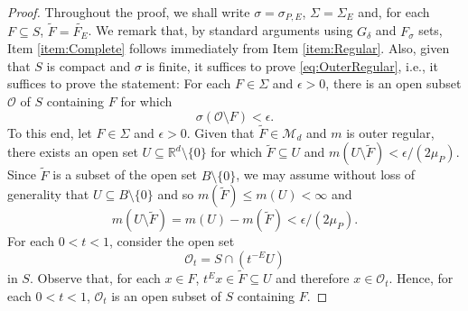 \documentclass[11pt]{article}
\begin{document}
\begin{proof}
Throughout the proof, we shall write $\sigma=\sigma_{P,E}$, $\Sigma=\Sigma_E$ and, for each $F\subseteq S$, $\widetilde{F}=\widetilde{F_E}$. We remark that, by standard arguments using $G_\delta$ and $F_\sigma$ sets, Item \ref{item:Complete} follows immediately from Item \ref{item:Regular}. Also, given that $S$ is compact and $\sigma$ is finite, it suffices to prove \eqref{eq:OuterRegular}, i.e., it suffices to prove the statement: For each $F\in \Sigma$ and $\epsilon>0$, there is an open subset $\mathcal{O}$ of $S$ containing $F$ for which 
\begin{equation*}
\sigma(\mathcal{O}\setminus F)<\epsilon.
\end{equation*}
To this end, let $F\in \Sigma$ and $\epsilon>0$. Given that $\widetilde{F}\in\mathcal{M}_d$ and $m$ is outer regular, there exists an open set $U\subseteq \mathbb{R}^d\setminus\{0\}$ for which $\widetilde{F}\subseteq U$ and $m(U\setminus\widetilde{F})<\epsilon/(2\mu_P)$. Since $\widetilde{F}$ is a subset of the open set $B\setminus\{0\}$, we may assume without loss of generality that $U\subseteq B\setminus\{0\}$ and so $m(\widetilde{F})\leq m(U)<\infty$ and
\begin{equation}\label{eq:LebesgueOuter}
m(U\setminus \widetilde{F})=m(U)-m(\widetilde{F})<\epsilon/(2\mu_P).
\end{equation}
For each $0<t<1$, consider the open set
\begin{equation*}
\mathcal{O}_t=S\cap\left( t^{-E}U\right)
\end{equation*}
in $S$. Observe that, for each $x\in F$, $t^E x\in \widetilde{F}\subseteq U$ and therefore $x\in \mathcal{O}_t$. Hence, for each $0<t<1$, $\mathcal{O}_t$ is an open subset of $S$ containing $F$. 


\end{proof}
\end{document}
